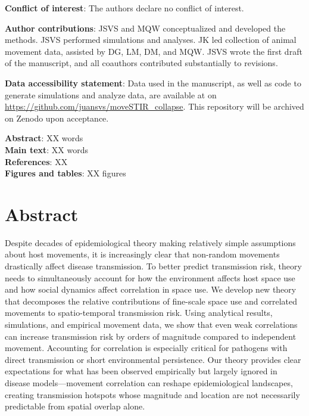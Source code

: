 \documentclass[letterpaper]{article}
\begin{document}
\noindent
\textbf{Conflict of interest}: The authors declare no conflict of interest.

\bigskip
\noindent
\textbf{Author contributions}: JSVS and MQW conceptualized and developed the methods. JSVS performed simulations and analyses. JK led collection of animal movement data, assisted by DG, LM, DM, and MQW. JSVS wrote the first draft of the manuscript, and all coauthors contributed substantially to revisions. 

\bigskip
\noindent
\textbf{Data accessibility statement}: Data used in the manuscript, as well as code to generate simulations and analyze data, are available at on \url{https://github.com/juansvs/moveSTIR_collapse}. This repository will be archived on Zenodo upon acceptance.

\bigskip
\noindent
\textbf{Abstract}: XX words\\
\textbf{Main text}:  XX words\\
\textbf{References}: XX \\
\textbf{Figures and tables}: XX figures \\

\newpage

\doublespacing
\linenumbers

\section*{Abstract} %
Despite decades of epidemiological theory making relatively simple assumptions about host movements, it is increasingly clear that non-random movements drastically affect disease transmission. To better predict transmission risk, theory needs to simultaneously account for how the environment affects host space use and how social dynamics affect correlation in space use. We develop new theory that decomposes the relative contributions of fine-scale space use and correlated movements to spatio-temporal transmission risk. Using analytical results, simulations, and empirical movement data, we show that even weak correlations can increase transmission risk by orders of magnitude compared to independent movement. Accounting for correlation is especially critical for pathogens with direct transmission or short environmental persistence. Our theory provides clear expectations for what has been observed empirically but largely ignored in disease models---movement correlation can reshape epidemiological landscapes, creating transmission hotspots whose magnitude and location are not necessarily predictable from spatial overlap alone.
\end{document}
